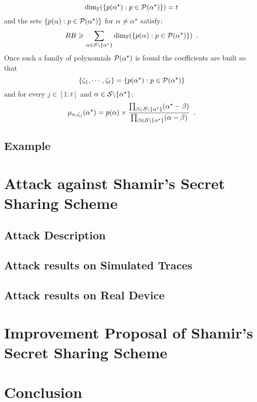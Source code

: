 \documentclass{llncs}
\begin{document}
$$
\dim_{\mathbb{F}} (\{p(\alpha^{\star}): p\in \mathcal{P}(\alpha^{\star})\}) = t
$$
and the sets $\{p(\alpha): p\in \mathcal{P}(\alpha^{\star})\}$ for $\alpha \neq \alpha^{\star}$ satisfy:
$$
RB \geqslant \sum_{\alpha \in \mathcal{S} \backslash \{\alpha^{\star}\}} \dim_{\mathbb{F}} (\{p(\alpha): p\in \mathcal{P}(\alpha^{\star})\}) \enspace .
$$
Once such a family of polynomials $\mathcal{P}(\alpha^{\star})$ is found the coefficients are built so that
$$
\{\zeta_1,\cdots,\zeta_t\} = \{p(\alpha^{\star}): p\in \mathcal{P}(\alpha^{\star})\}
$$
and for every $j\in [1:t]$ and $\alpha \in \mathcal{S} \backslash \{\alpha^{\star}\}$;
$$
\mu_{\alpha,\zeta_j}(\alpha^{\star}) = p(\alpha)\times \frac{\prod_{\beta\in \mathcal{S} \backslash \{\alpha^{\star}\}}(\alpha^{\star} - \beta)}{\prod_{\beta\in \mathcal{S} \backslash \{\alpha^{\star}\}}(\alpha - \beta)} \enspace .
$$

 
\subsection{Example}
 \todo{}

\section{Attack against Shamir's Secret Sharing Scheme }
\subsection{Attack Description}
 \todo{}
\subsection{Attack results on Simulated Traces}
 \todo{}
\subsection{Attack results on Real Device}
 \todo{}


\section{Improvement Proposal of Shamir's Secret Sharing Scheme}
 \todo{}

\section{Conclusion}
\label{sec-conc}
 \todo{}
 


\end{document}
